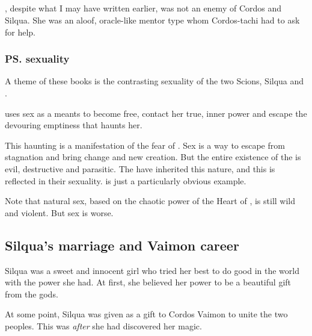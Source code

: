 \subsection{\Delphine}
\Delphine, despite what I may have written earlier, was not an enemy of Cordos and Silqua. 
She was an aloof, oracle-like mentor type whom Cordos-tachi had to ask for help. 






\subsubsection{\ps{\Delphine}{} sexuality}
A theme of these books is the contrasting sexuality of the two Scions, Silqua and \Delphine{}. 

\Delphine{} uses sex as a meants to become free, contact her true, inner power and escape the devouring emptiness that haunts her. 

This haunting is a manifestation of the \pps{\banes}{} fear of . 
Sex is a way to escape from stagnation and bring change and new creation. But the entire existence of the \banes{} is evil, destructive and parasitic. 
The \resphain{} have inherited this nature, and this is reflected in their sexuality. \Shiaraid{} is just a particularly obvious example. 

Note that natural sex, based on the chaotic power of the Heart of \Miith{}, is still wild and violent. But \resphan{} sex is worse. 









\subsection{Silqua's marriage and Vaimon career}
Silqua was a sweet and innocent girl who tried her best to do good in the world with the power she had. 
At first, she believed her power to be a beautiful gift from the gods. 


At some point, Silqua was given as a gift to Cordos Vaimon to unite the two peoples. 
This was \emph{after} she had discovered her magic. 


